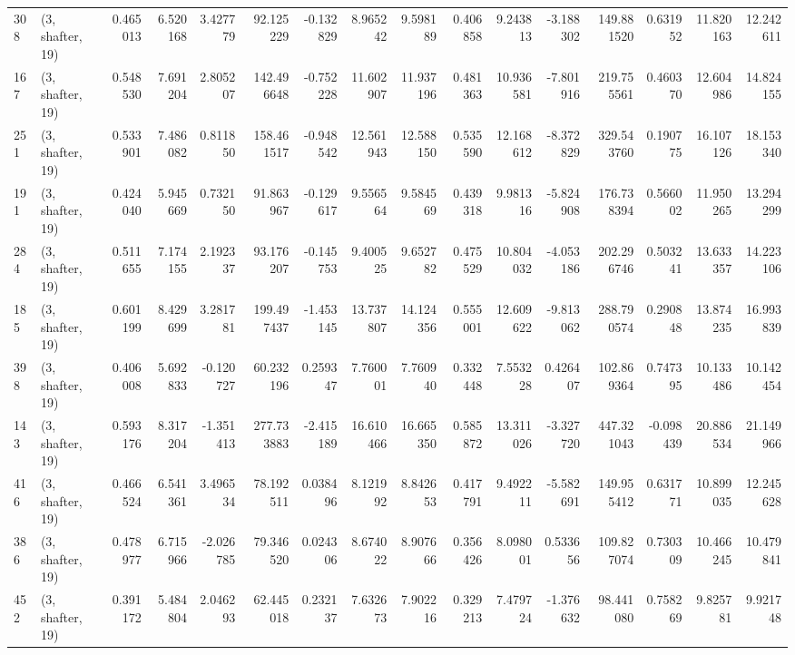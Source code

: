 \begin{tabular}{llrrrrrrrrrrrrrr}
308 &  (3, shafter, 19) &   0.465013 &   6.520168 &   3.427779 &    92.125229 &  -0.132829 &   8.965242 &   9.598189 &  0.406858 &   9.243813 &  -3.188302 &    149.881520 &    0.631952 &   11.820163 &   12.242611 \\
167 &  (3, shafter, 19) &   0.548530 &   7.691204 &   2.805207 &   142.496648 &  -0.752228 &  11.602907 &  11.937196 &  0.481363 &  10.936581 &  -7.801916 &    219.755561 &    0.460370 &   12.604986 &   14.824155 \\
251 &  (3, shafter, 19) &   0.533901 &   7.486082 &   0.811850 &   158.461517 &  -0.948542 &  12.561943 &  12.588150 &  0.535590 &  12.168612 &  -8.372829 &    329.543760 &    0.190775 &   16.107126 &   18.153340 \\
191 &  (3, shafter, 19) &   0.424040 &   5.945669 &   0.732150 &    91.863967 &  -0.129617 &   9.556564 &   9.584569 &  0.439318 &   9.981316 &  -5.824908 &    176.738394 &    0.566002 &   11.950265 &   13.294299 \\
284 &  (3, shafter, 19) &   0.511655 &   7.174155 &   2.192337 &    93.176207 &  -0.145753 &   9.400525 &   9.652782 &  0.475529 &  10.804032 &  -4.053186 &    202.296746 &    0.503241 &   13.633357 &   14.223106 \\
185 &  (3, shafter, 19) &   0.601199 &   8.429699 &   3.281781 &   199.497437 &  -1.453145 &  13.737807 &  14.124356 &  0.555001 &  12.609622 &  -9.813062 &    288.790574 &    0.290848 &   13.874235 &   16.993839 \\
398 &  (3, shafter, 19) &   0.406008 &   5.692833 &  -0.120727 &    60.232196 &   0.259347 &   7.760001 &   7.760940 &  0.332448 &   7.553228 &   0.426407 &    102.869364 &    0.747395 &   10.133486 &   10.142454 \\
143 &  (3, shafter, 19) &   0.593176 &   8.317204 &  -1.351413 &   277.733883 &  -2.415189 &  16.610466 &  16.665350 &  0.585872 &  13.311026 &  -3.327720 &    447.321043 &   -0.098439 &   20.886534 &   21.149966 \\
416 &  (3, shafter, 19) &   0.466524 &   6.541361 &   3.496534 &    78.192511 &   0.038496 &   8.121992 &   8.842653 &  0.417791 &   9.492211 &  -5.582691 &    149.955412 &    0.631771 &   10.899035 &   12.245628 \\
386 &  (3, shafter, 19) &   0.478977 &   6.715966 &  -2.026785 &    79.346520 &   0.024306 &   8.674022 &   8.907666 &  0.356426 &   8.098001 &   0.533656 &    109.827074 &    0.730309 &   10.466245 &   10.479841 \\
452 &  (3, shafter, 19) &   0.391172 &   5.484804 &   2.046293 &    62.445018 &   0.232137 &   7.632673 &   7.902216 &  0.329213 &   7.479724 &  -1.376632 &     98.441080 &    0.758269 &    9.825781 &    9.921748 \\

\end{tabular}
